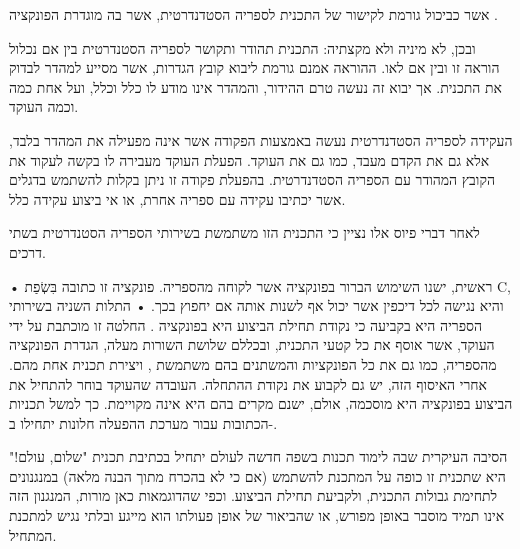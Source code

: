
\setRTL{}

אשר כביכול גורמת לקישור של התכנית לספריה הסטדנדרטית, אשר בה מוגדרת הפונקציה .

ובכן, לא מיניה ולא מקצתיה: התכנית תהודר ותקושר לספריה הסטנדרטית בין אם נכלול
הוראה זו ובין אם לאו. ההוראה אמנם גורמת ליבוא קובץ הגדרות, אשר מסייע למהדר
לבדוק את התכנית. אך יבוא זה נעשה טרם ההידור, והמהדר אינו מודע לו כלל וכלל, ועל
אחת כמה וכמה העוקד.

העקידה לספריה הסטדנדרטית נעשה באמצעות הפקודה  אשר אינה מפעילה את המהדר
בלבד, אלא גם את הקדם מעבד, כמו גם את העוקד. הפעלת העוקד מעבירה לו בקשה לעקוד את
הקובץ המהודר עם הספריה הסטדנדרטית. בהפעלת פקודה זו ניתן בקלות להשתמש בדגלים אשר
יכתיבו עקידה עם ספריה אחרת, או אי ביצוע עקידה כלל.

לאחר דברי פיוס אלו נציין כי התכנית הזו משתמשת בשירותי הספריה הסטנדרטית בשתי דרכים.
\begin{itemize}
• ראשית, ישנו השימוש הברור בפונקציה  אשר לקוחה מהספריה. פונקציה זו כתובה בִּשְׂפַת C, והיא נגישה לכל דיכפין אשר יכול אף לשנות אותה אם יחפוץ בכך.
• התלות השניה בשירותי הספריה היא בקביעה כי נקודת תחילת הביצוע היא בפונקציה . החלטה זו מוכתבת על ידי העוקד, אשר אוסף את כל קטעי התכנית, ובכללם שלושת השורות מעלה, הגדרת הפונקציה  מהספריה, כמו גם את כל הפונקציות והמשתנים בהם משתמשת , ויצירת תכנית אחת מהם. אחרי האיסוף הזה, יש גם לקבוע את נקודת ההתחלה.
העובדה שהעוקד בוחר להתחיל את הביצוע בפונקציה  היא מוסכמה, אולם, ישנם מקרים בהם היא אינה מקויימת. כך למשל תכניות הכתובות עבור מערכת ההפעלה חלונות יתחילו ב-.
\end{itemize}

הסיבה העיקרית שבה לימוד תכנות בשפה חדשה לעולם יתחיל בכתיבת תכנית "שלום, עולם!"
היא שתכנית זו כופה על המתכנת להשתמש (אם כי לא בהכרח מתוך הבנה מלאה) במנגנונים
לתחימת גבולות התכנית, ולקביעת תחילת הביצוע. וכפי שהדוגמאות כאן מורות, המנגנון
הזה אינו תמיד מוסבר באופן מפורש, או שהביאור של אופן פעולתו הוא מייגע ובלתי נגיש
למתכנת המתחיל.

